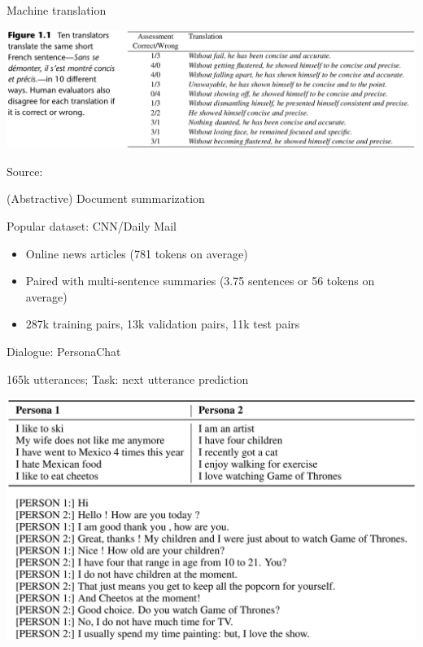 \documentclass[12pt,aspectratio=169,handout]{beamer}
\begin{document}
\begin{frame}{Machine translation}
	

\includegraphics[width=15cm]{img/mt2.png}
	
	
Source: 
	
\end{frame}


\begin{frame}{(Abstractive) Document summarization}

Popular dataset: CNN/Daily Mail

\begin{itemize}
	\item Online news articles (781 tokens on average)
	\item Paired with multi-sentence summaries (3.75 sentences or 56 tokens on average)
	\item 287k training pairs, 13k validation pairs, 11k test pairs
\end{itemize}


\end{frame}

\begin{frame}{Dialogue: PersonaChat}
	
165k utterances; Task: next utterance prediction
	
\includegraphics[width=\linewidth]{img/dial1.png}


\end{frame}
\end{document}
